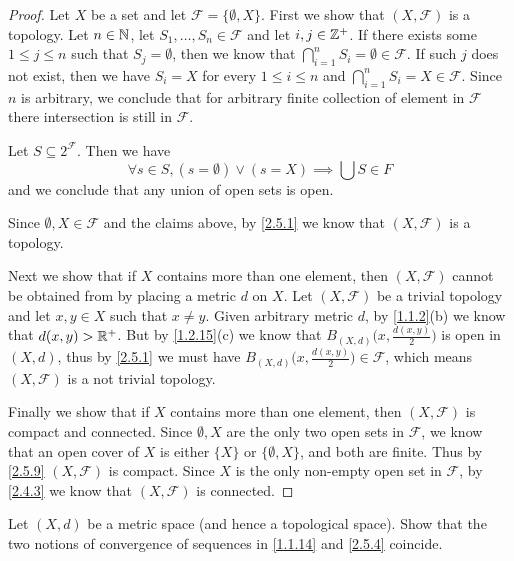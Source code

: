 \begin{proof}
  Let \(X\) be a set and let \(\mathcal{F} = \{\emptyset, X\}\).
  First we show that \((X, \mathcal{F})\) is a topology.
  Let \(n \in \mathbb{N}\), let \(S_1, \dots, S_n \in \mathcal{F}\) and let \(i, j \in \mathbb{Z}^+\).
  If there exists some \(1 \leq j \leq n\) such that \(S_j = \emptyset\), then we know that \(\bigcap_{i = 1}^n S_i = \emptyset \in \mathcal{F}\).
  If such \(j\) does not exist, then we have \(S_i = X\) for every \(1 \leq i \leq n\) and \(\bigcap_{i = 1}^n S_i = X \in \mathcal{F}\).
  Since \(n\) is arbitrary, we conclude that for arbitrary finite collection of element in \(\mathcal{F}\) there intersection is still in \(\mathcal{F}\).

  Let \(S \subseteq 2^{\mathcal{F}}\).
  Then we have
  \[
    \forall s \in S, (s = \emptyset) \lor (s = X) \implies \bigcup S \in F
  \]
  and we conclude that any union of open sets is open.

  Since \(\emptyset, X \in \mathcal{F}\) and the claims above, by \cref{2.5.1} we know that \((X, \mathcal{F})\) is a topology.

  Next we show that if \(X\) contains more than one element, then \((X, \mathcal{F})\) cannot be obtained from by placing a metric \(d\) on \(X\).
  Let \((X, \mathcal{F})\) be a trivial topology and let \(x, y \in X\) such that \(x \neq y\).
  Given arbitrary metric \(d\), by \cref{1.1.2}(b) we know that \(d(x, y) > \mathbb{R}^+\).
  But by \cref{1.2.15}(c) we know that \(B_{(X, d)}\big(x, \frac{d(x, y)}{2}\big)\) is open in \((X, d)\), thus by \cref{2.5.1} we must have \(B_{(X, d)}\big(x, \frac{d(x, y)}{2}\big) \in \mathcal{F}\), which means \((X, \mathcal{F})\) is a not trivial topology.

  Finally we show that if \(X\) contains more than one element, then \((X, \mathcal{F})\) is compact and connected.
  Since \(\emptyset, X\) are the only two open sets in \(\mathcal{F}\), we know that an open cover of \(X\) is either \(\{X\}\) or \(\{\emptyset, X\}\), and both are finite.
  Thus by \cref{2.5.9} \((X, \mathcal{F})\) is compact.
  Since \(X\) is the only non-empty open set in \(\mathcal{F}\), by \cref{2.4.3} we know that \((X, \mathcal{F})\) is connected.
\end{proof}

\begin{ex}\label{ex:2.5.2}
  Let \((X, d)\) be a metric space
  (and hence a topological space).
  Show that the two notions of convergence of sequences in \cref{1.1.14} and \cref{2.5.4} coincide.
\end{ex}


